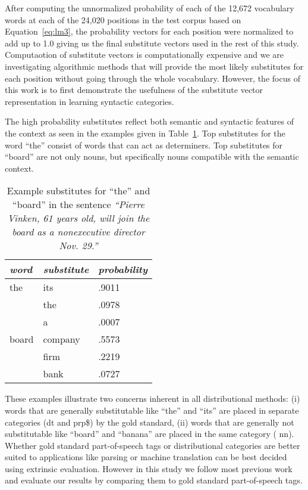 After computing the unnormalized probability of each of the 12,672
vocabulary words at each of the 24,020 positions in the test corpus
based on Equation~\ref{eq:lm3}, the probability vectors for each
position were normalized to add up to 1.0 giving us the final
substitute vectors used in the rest of this study.  Computaotion of
substitute vectors is computationally expensive and we are
investigating algorithmic methods that will provide the most likely
substitutes for each position without going through the whole
vocabulary.  However, the focus of this work is to first demonstrate
the usefulness of the substitute vector representation in learning
syntactic categories.

The high probability substitutes reflect both semantic and syntactic
features of the context as seen in the examples given in
Table~\ref{tab:subs}.  Top substitutes for the word ``the'' consist of
words that can act as determiners.  Top substitutes for ``board'' are
not only nouns, but specifically nouns compatible with the semantic
context.

\begin{table}[h]\centering
\begin{tabular}{|l|ll|} \hline
\emph{word} & \emph{substitute} & \emph{probability} \\ \hline
the	& its & .9011 \\
	& the & .0978 \\
	& a & .0007 \\ \hline
board	& company & .5573 \\
	& firm & .2219 \\
	& bank & .0727 \\ \hline
\end{tabular}
\caption{Example substitutes for ``the'' and ``board'' in the sentence {\em ``Pierre Vinken, 61 years old, will join the  board as a nonexecutive director Nov. 29.''}}
\label{tab:subs}
\end{table}

These examples illustrate two concerns inherent in all distributional
methods: (i) words that are generally substitutable like ``the'' and
``its'' are placed in separate categories ({\sc dt} and {\sc prp\$})
by the gold standard, (ii) words that are generally not substitutable
like ``board'' and ``banana'' are placed in the same category ({\sc
  nn}).  Whether gold standard part-of-speech tags or distributional
categories are better suited to applications like parsing or machine
translation can be best decided using extrinsic evaluation.  However
in this study we follow most previous work and evaluate our results by
comparing them to gold standard part-of-speech tags.
